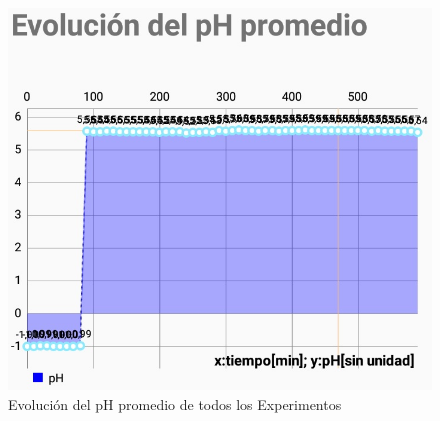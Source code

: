             \begin{figure}[H]
                \centering
                \includegraphics[scale=0.65]{Pruebas/EscalonadaEvolPhProm.jpg}
                \caption{Evolución del pH promedio de todos los Experimentos}
                \label{fig:EscPhProm}
            \end{figure}     
